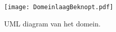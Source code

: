 \label{bijlagen}
\begin{figure}[h!]
\texttt{[image: DomeinlaagBeknopt.pdf]}
\caption{UML diagram van het domein.}
\label{fig:DomeinlaagBeknopt}
\end{figure}
